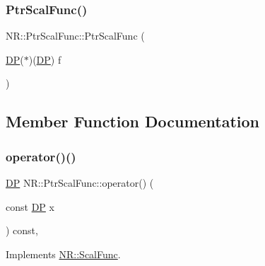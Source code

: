 \mbox{\label{classNR_1_1PtrScalFunc_aa3e7954dd902a46c492bd39d4c21a71c}} 
\subsubsection{\texorpdfstring{PtrScalFunc()}{PtrScalFunc()}\hspace{0.1cm}{\footnotesize\ttfamily [2/2]}}
{\footnotesize\ttfamily N\+R\+::\+Ptr\+Scal\+Func\+::\+Ptr\+Scal\+Func (\begin{DoxyParamCaption}\item[{\mbox{\hyperlink{namespaceNR_af6ff762dd605ff477b8e52387253a02a}{DP}}($\ast$)(\mbox{\hyperlink{namespaceNR_af6ff762dd605ff477b8e52387253a02a}{DP}})}]{f }\end{DoxyParamCaption})\hspace{0.3cm}{\ttfamily [inline]}}



\subsection{Member Function Documentation}
\mbox{\label{classNR_1_1PtrScalFunc_a661b2194b67e1e0e0de15389f0cea5f1}} 
\subsubsection{\texorpdfstring{operator()()}{operator()()}\hspace{0.1cm}{\footnotesize\ttfamily [1/2]}}
{\footnotesize\ttfamily \mbox{\hyperlink{namespaceNR_af6ff762dd605ff477b8e52387253a02a}{DP}} N\+R\+::\+Ptr\+Scal\+Func\+::operator() (\begin{DoxyParamCaption}\item[{const \mbox{\hyperlink{namespaceNR_af6ff762dd605ff477b8e52387253a02a}{DP}}}]{x }\end{DoxyParamCaption}) const\hspace{0.3cm}{\ttfamily [inline]}, {\ttfamily [virtual]}}



Implements \mbox{\hyperlink{classNR_1_1ScalFunc_a7dae30ac413c03bb0acfae13b7abb57e}{N\+R\+::\+Scal\+Func}}.

